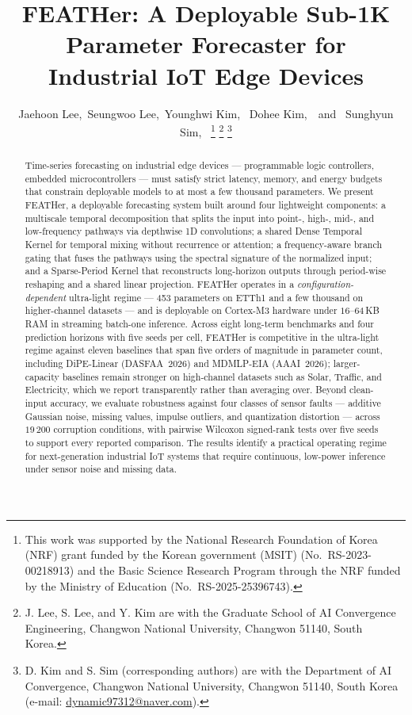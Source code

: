 \documentclass[journal]{IEEEtran}
\title{FEATHer: A Deployable Sub-1K Parameter Forecaster for\\
Industrial IoT Edge Devices}
\author{
    Jaehoon Lee,~Seungwoo Lee,~Younghwi Kim,~%
    Dohee Kim,~\IEEEmembership{Member,~IEEE,}~and~%
    Sunghyun Sim,~\IEEEmembership{Member,~IEEE}%
    \thanks{This work was supported by the National Research Foundation
    of Korea (NRF) grant funded by the Korean government (MSIT)
    (No.~RS-2023-00218913) and the Basic Science Research Program
    through the NRF funded by the Ministry of Education
    (No.~RS-2025-25396743).}%
    \thanks{J. Lee, S. Lee, and Y. Kim are with the Graduate School of
    AI Convergence Engineering, Changwon National University, Changwon
    51140, South Korea.}%
    \thanks{D. Kim and S. Sim (corresponding authors) are with the
    Department of AI Convergence, Changwon National University,
    Changwon 51140, South Korea
    (e-mail: \href{mailto:dynamic97312@naver.com}{dynamic97312@naver.com}).}%
}
\theoremstyle{remark}
\begin{document}
\maketitle

\begin{abstract}
Time-series forecasting on industrial edge devices --- programmable
logic controllers, embedded microcontrollers --- must satisfy strict
latency, memory, and energy budgets that constrain deployable models to
at most a few thousand parameters. We present FEATHer, a deployable
forecasting system built around four lightweight components: a
multiscale temporal decomposition that splits the input into point-,
high-, mid-, and low-frequency pathways via depthwise 1D convolutions;
a shared Dense Temporal Kernel for temporal mixing without recurrence
or attention; a frequency-aware branch gating that fuses the pathways
using the spectral signature of the normalized input; and a
Sparse-Period Kernel that reconstructs long-horizon outputs through
period-wise reshaping and a shared linear projection. FEATHer operates
in a \emph{configuration-dependent} ultra-light regime --- 453
parameters on ETTh1 and a few thousand on higher-channel datasets ---
and is deployable on Cortex-M3 hardware under $16$--$64$\,KB RAM in
streaming batch-one inference. Across eight long-term benchmarks and
four prediction horizons with five seeds per cell, FEATHer is
competitive in the ultra-light regime against eleven baselines that
span five orders of magnitude in parameter count, including DiPE-Linear
(DASFAA~2026) and MDMLP-EIA (AAAI~2026); larger-capacity baselines
remain stronger on high-channel datasets such as Solar, Traffic, and
Electricity, which we report transparently rather than averaging over.
Beyond clean-input accuracy, we evaluate robustness against four
classes of sensor faults --- additive Gaussian noise, missing values,
impulse outliers, and quantization distortion --- across $19\,200$
corruption conditions, with pairwise Wilcoxon signed-rank tests over
five seeds to support every reported comparison. The results identify a
practical operating regime for next-generation industrial IoT systems
that require continuous, low-power inference under sensor noise and
missing data.
\end{abstract}
\end{document}
